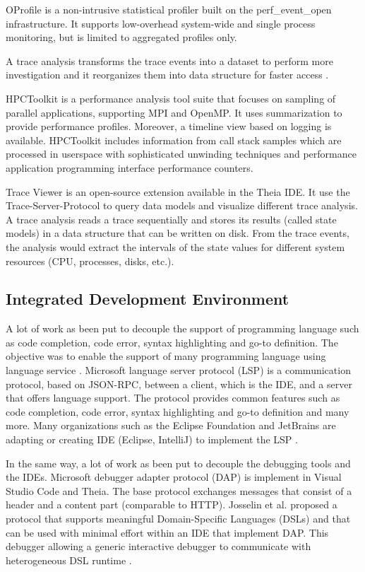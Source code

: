 OProfile \cite{sourceforgeAboutOProfile} is a non-intrusive statistical profiler built on the perf\_event\_open infrastructure. It supports low-overhead system-wide and single process monitoring, but is limited to aggregated profiles only.

A trace analysis transforms the trace events into a dataset to perform more investigation and it reorganizes them into data structure for faster access \cite{prieur2018r}.

HPCToolkit \cite{adhianto2010hpctoolkit} is a performance analysis tool suite that focuses on sampling of parallel applications, supporting MPI and OpenMP. It uses summarization to provide performance profiles. Moreover, a timeline view based on logging is available. HPCToolkit includes information from call stack samples which are processed in userspace with sophisticated unwinding techniques and performance application programming interface performance counters.

Trace Viewer is an open-source extension available in the Theia IDE. It use the Trace-Server-Protocol to query data models and visualize different trace analysis. A trace analysis reads a trace sequentially and stores its results (called state models) in a data structure that can be written on disk. From the trace events, the analysis would extract the intervals of the state values for different system resources (CPU, processes, disks, etc.). \cite{chen2021distributed}

\subsection{Integrated Development Environment}

A lot of work as been put to decouple the support of programming language such as code completion, code error, syntax highlighting and go-to definition. The objective was to enable the support of many programming language using language service \cite{Keidel2016}. Microsoft language server protocol (LSP) is a communication protocol, based on JSON-RPC, between a client, which is the IDE, and a server that offers language support. The protocol provides common features such as code completion, code error, syntax highlighting and go-to definition and many more. Many organizations such as the Eclipse Foundation and JetBrains are adapting or creating IDE (Eclipse, IntelliJ) to implement the LSP \cite{Bunder2019}. 

In the same way, a lot of work as been put to decouple the debugging tools and the IDEs. Microsoft debugger adapter protocol (DAP) is implement in Visual Studio Code and Theia. The base protocol exchanges messages that consist of a header and a content part (comparable to HTTP). Josselin et al. proposed a protocol that supports meaningful Domain-Specific Languages (DSLs) and that can be used with minimal effort within an IDE that implement DAP. This debugger allowing a generic interactive debugger to communicate with heterogeneous DSL runtime \cite{enet2023}. 

